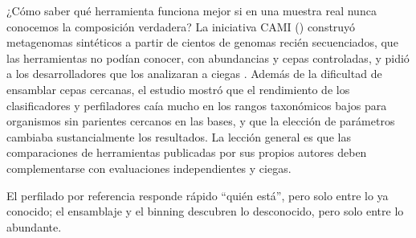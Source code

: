 \begin{profundizacion}
¿Cómo saber qué herramienta funciona mejor si en una muestra real nunca conocemos la composición verdadera? La iniciativa CAMI () construyó metagenomas sintéticos a partir de cientos de genomas recién secuenciados, que las herramientas no podían conocer, con abundancias y cepas controladas, y pidió a los desarrolladores que los analizaran a ciegas \parencite{c14-sczyrba2017}. Además de la dificultad de ensamblar cepas cercanas, el estudio mostró que el rendimiento de los clasificadores y perfiladores caía mucho en los rangos taxonómicos bajos para organismos sin parientes cercanos en las bases, y que la elección de parámetros cambiaba sustancialmente los resultados. La lección general es que las comparaciones de herramientas publicadas por sus propios autores deben complementarse con evaluaciones independientes y ciegas.
\end{profundizacion}

\begin{ideaclave}
El perfilado por referencia responde rápido ``quién está'', pero solo entre lo ya conocido; el ensamblaje y el binning descubren lo desconocido, pero solo entre lo abundante.
\end{ideaclave}

